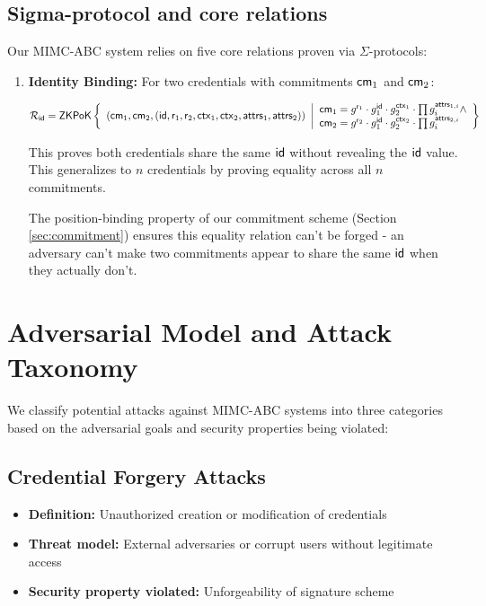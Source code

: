 \subsection{Sigma-protocol and core relations}

Our MIMC-ABC system relies on five core relations proven via $\Sigma$-protocols:
\begin{enumerate}
  

    \item \textbf{Identity Binding:} For two credentials with commitments $\mathsf{cm}_1$ and $\mathsf{cm}_2$:

    \[
    {\mathcal{R}_{\mathsf{id}}} = {\mathsf{ZKPoK}} \left\{ 
    \begin{array}{l} 
    (\mathsf{cm}_1, \mathsf{cm}_2, (\mathsf{id}, \mathsf{r}_1, \mathsf{r}_2, \mathsf{ctx}_1, \mathsf{ctx}_2, \mathsf{attrs}_1, \mathsf{attrs}_2)) \\
    \end{array} 
    \middle|
    \begin{array}{l}
    \mathsf{cm}_1 = g^{\mathsf{r}_1} \cdot g_1^{\mathsf{id}} \cdot g_2^{\mathsf{ctx}_1} \cdot \prod g_i^{\mathsf{attrs}_{1,i}} \wedge \\
     \mathsf{cm}_2 = g^{\mathsf{r}_2} \cdot g_1^{\mathsf{id}} \cdot g_2^{\mathsf{ctx}_2} \cdot \prod g_i^{\mathsf{attrs}_{2,i}} \\
    \end{array} 
    \right\}
    \]
    
    This proves both credentials share the same $\mathsf{id}$ without revealing the $\mathsf{id}$ value. This generalizes to $n$ credentials by proving equality across all $n$ commitments.
    
    The position-binding property of our commitment scheme (Section \ref{sec:commitment}) ensures this equality relation can't be forged - an adversary can't make two commitments appear to share the same $\mathsf{id}$ when they actually don't.
    
\end{enumerate}

\section{Adversarial Model and Attack Taxonomy}
\label{sec:attack-taxonomy}

We classify potential attacks against MIMC-ABC systems into three categories based on the adversarial goals and security properties being violated:

\subsection{Credential Forgery Attacks}
\begin{itemize}
    \item \textbf{Definition:} Unauthorized creation or modification of credentials
    \item \textbf{Threat model:} External adversaries or corrupt users without legitimate access
    \item \textbf{Security property violated:} Unforgeability of signature scheme
\end{itemize}

